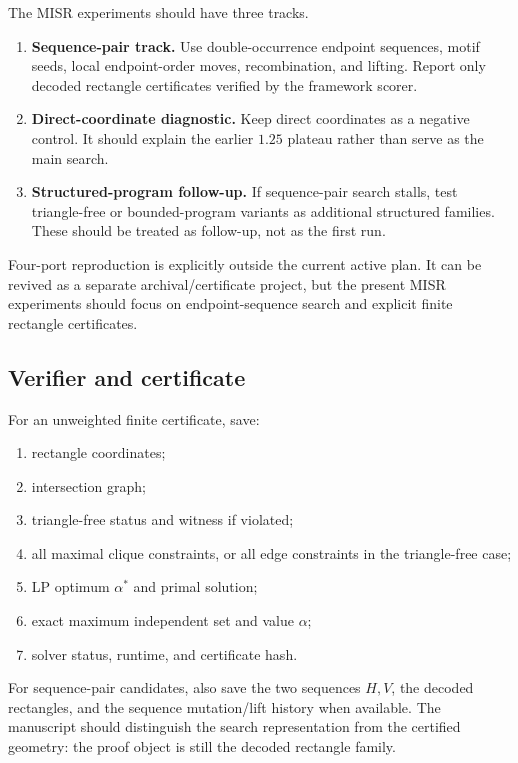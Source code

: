 \documentclass[11pt]{article}
\begin{document}
The MISR experiments should have three tracks.

\begin{enumerate}
\item \textbf{Sequence-pair track.}  Use double-occurrence endpoint sequences,
motif seeds, local endpoint-order moves, recombination, and lifting.  Report
only decoded rectangle certificates verified by the framework scorer.
\item \textbf{Direct-coordinate diagnostic.}  Keep direct coordinates as a
negative control.  It should explain the earlier $1.25$ plateau rather than
serve as the main search.
\item \textbf{Structured-program follow-up.}  If sequence-pair search stalls,
test triangle-free or bounded-program variants as additional structured
families.  These should be treated as follow-up, not as the first run.
\end{enumerate}

Four-port reproduction is explicitly outside the current active plan.  It can
be revived as a separate archival/certificate project, but the present MISR
experiments should focus on endpoint-sequence search and explicit finite
rectangle certificates.

\subsection{Verifier and certificate}

For an unweighted finite certificate, save:
\begin{enumerate}
\item rectangle coordinates;
\item intersection graph;
\item triangle-free status and witness if violated;
\item all maximal clique constraints, or all edge constraints in the
triangle-free case;
\item LP optimum $\alpha^*$ and primal solution;
\item exact maximum independent set and value $\alpha$;
\item solver status, runtime, and certificate hash.
\end{enumerate}

For sequence-pair candidates, also save the two sequences $H,V$, the decoded
rectangles, and the sequence mutation/lift history when available.  The
manuscript should distinguish the search representation from the certified
geometry: the proof object is still the decoded rectangle family.
\end{document}
